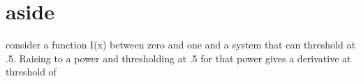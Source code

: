 


\section{aside }

consider a function I(x) between zero and one and a system that
can threshold at .5. Raising to a power and thresholding at
.5 for that power gives a derivative at threshold of




